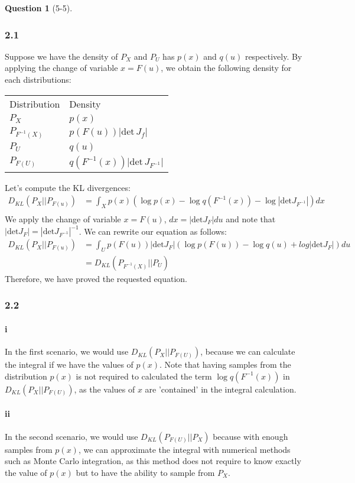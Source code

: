 \documentclass[12pt]{article}
\theoremstyle{definition}
\newtheorem{exercise}{Question}%
\begin{document}
\begin{exercise}[5-5]
{  \subsubsection*{2.1}
Suppose we have the density of $P_{X }$ and $P_{U}$ has $p(x)$ and $q(u)$ respectively.
By applying the change of variable $x = F(u)$, we obtain the following density for each distributions:
\begin{table}[H]
\centering
\begin{tabular}{ll}
Distribution & Density  \\
 $P_X $ & $p(x)$ \\
 $P_{F^{-1}(X)}$&  $p(F(u))\vert \text{det}\,{J_{f}} \vert $ \\
 $P_U $& $q(u)$ \\
 $P_{F(U)} $& $q(F^{-1}(x)) \vert \text{det}\,{J_{F^{-1}}}  \vert$
\end{tabular}%
\end{table}
Let's compute the KL divergences:
\begin{align*}
  D_{KL} (P_{X}|| P_{F(u)}) &= \int_{X} p(x) (\log p(x) - \log q(F^{-1}(x)) - \log |\text{det} J_{F^{-1}}|) dx \\
\end{align*} We apply the change of variable $x = F(u)$,
$dx = | \text{det} J_{F}| du$ and note that
$|\text{det} J_{F}|= | \text{det} J_{F^{-1}} |^{-1}$. We can rewrite our
equation as follows:
\begin{align*}
D_{KL} (P_{X}|| P_{F(u)}) &= \int_{U} p(F(u))|\text{det}  J_{F}| (\log p(F(u)) - \log q(u) + log | \text{det} J_F |) du\\
  &= D_{KL}(P_{F^{-1}(X) }|| P_{U})
\end{align*}Therefore, we have proved the requested equation.
  \subsubsection*{2.2}
  \paragraph{i}
  In the first scenario, we would use $D_{KL}(P_{X}||P_{F(U)})$, because we can
  calculate the integral if we have the values of $p(x)$. Note that having
  samples from the distribution $p(x)$ is not required to calculated
  the term $\log q(F^{-1}(x))$ in $D_{KL}(P_{X}||P_{F(U)})$, as the values of
  $x$ are 'contained' in the integral calculation.
  \paragraph{ii} In the second scenario, we would use $D_{KL}(P_{F(U)}||P_{X})$
  because with enough samples from $p(x)$, we can approximate the integral with
  numerical methods such as Monte Carlo integration, as this method does not
  require to know exactly the value of $p(x)$ but to have the ability to sample
  from $P_{X}$.
}
\end{exercise}
\end{document}

